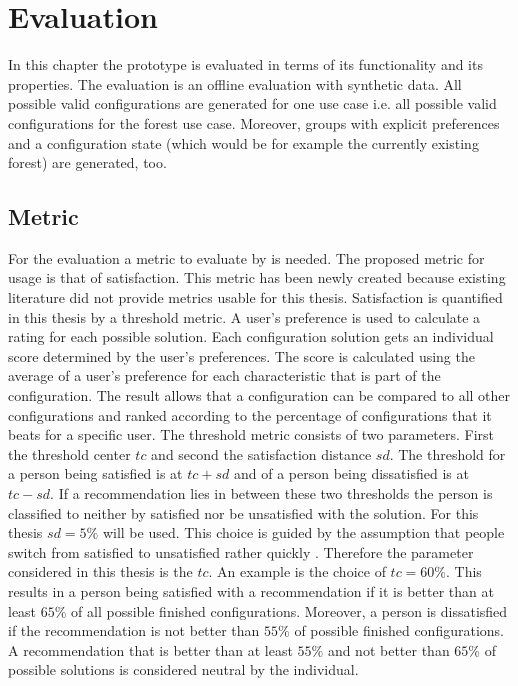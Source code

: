 \chapter{Evaluation}
\label{ch:Evaluation}

In this chapter the prototype is evaluated in terms of its functionality and its properties. The evaluation is an offline evaluation with synthetic data. All possible valid configurations are generated for one use case i.e. all possible valid configurations for the forest use case. Moreover, groups with explicit preferences and a configuration state (which would be for example the currently existing forest) are generated, too.

\section{Metric}
\label{sec:Evaluation:Metrics}

For the evaluation a metric to evaluate by is needed. The proposed metric for usage is that of satisfaction. This metric has been newly created because existing literature did not provide metrics usable for this thesis. Satisfaction is quantified in this thesis by a threshold metric. A user's preference is used to calculate a rating for each possible solution. Each configuration solution gets an individual score determined by the user's preferences. The score is calculated using the average of a user's preference for each characteristic that is part of the configuration. The result allows that a configuration can be compared to all other configurations and ranked according to the percentage of configurations that it beats for a specific user. The threshold metric consists of two parameters. First the threshold center $tc$ and second the satisfaction distance $sd$. The threshold for a person being satisfied is at $tc + sd$ and of a person being dissatisfied is at $tc - sd$. If a recommendation lies in between these two thresholds the person is classified to neither by satisfied nor be unsatisfied with the solution. For this thesis  $sd=5\%$ will be used. This choice is guided by the assumption that people switch from satisfied to unsatisfied rather quickly . Therefore the parameter considered in this thesis is the $tc$. An example is the choice of $tc = 60\%$. This results in a person being satisfied with a recommendation if it is better than at least $65\%$ of all possible finished configurations. Moreover, a person is dissatisfied if the recommendation is not better than $55\%$ of possible finished configurations. A recommendation that is better than at least $55\%$ and not better than $65\%$ of possible solutions is considered neutral by the individual.


